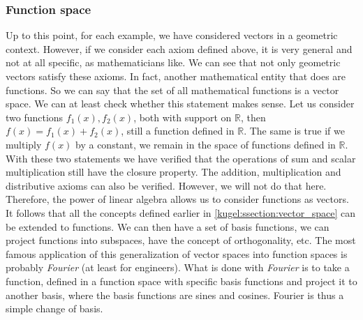 \subsubsection{Function space \label{kugel:ssection:function_space}}
Up to this point, for each example, we have considered vectors in a geometric context. However, if we consider each axiom defined above, it is very general and not at all specific, as mathematicians like.\newline
We can see that not only geometric vectors satisfy these axioms. In fact, another mathematical entity that does are functions.\newline 
So we can say that the set of all mathematical functions is a vector space.\newline
We can at least check whether this statement makes sense.\newline
Let us consider two functions $f_1(x), f_2(x)$, both with support on $\mathbb{R}$, then $f(x) = f_1(x) + f_2(x)$, still a function defined in $\mathbb{R}$.\newline 
The same is true if we multiply $f(x)$ by a constant, we remain in the space of functions defined in $\mathbb{R}$.\newline
With these two statements we have verified that the operations of sum and scalar multiplication still have the closure property. The addition, multiplication and distributive axioms can also be verified. However, we will not do that here.\newline
Therefore, the power of linear algebra allows us to consider functions as vectors. It follows that all the concepts defined earlier in \ref{kugel:ssection:vector_space} can be extended to functions.\newline
We can then have a set of basis functions, we can project functions into subspaces, have the concept of orthogonality, etc.\newline
The most famous application of this generalization of vector spaces into function spaces is probably \emph{Fourier} (at least for engineers).\newline
What is done with \emph{Fourier} is to take a function, defined in a function space with specific basis functions and project it to another basis, where the basis functions are sines and cosines. Fourier is thus a simple change of basis.

